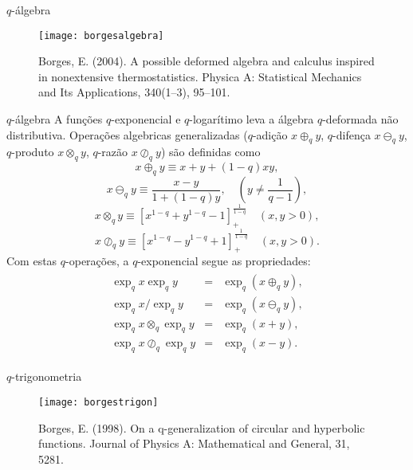 \documentclass{beamer}
\begin{document}
\begin{frame}{$q$-álgebra}
\begin{figure}
\texttt{[image: borgesalgebra]}
\caption{Borges, E. (2004). A possible deformed algebra and calculus inspired in nonextensive thermostatistics. Physica A: Statistical Mechanics and Its Applications, 340(1–3), 95–101.}
\end{figure}
\end{frame}

\begin{frame}{$q$-álgebra}
A funções $q$-exponencial e $q$-logarítimo leva
a álgebra $q$-deformada não distributiva.    
Operações algebricas generalizadas 
($q$-adição $x \oplus_q y$, $q$-difença $x \ominus_q y$,
$q$-produto $x \otimes_q y$, $q$-razão $x \oslash_q y$) são definidas como
%
\begin{equation}
\label{eq:qsum}
 x\oplus_q y \equiv x+y+(1-q)xy,
\end{equation}
%
\begin{equation}
\label{eq:qdiff}
 x\ominus_q y \equiv \frac{x-y}{1+(1-q)y}, \quad (y\ne \frac{1}{q-1}),
\end{equation}
%
\begin{equation}
\label{eq:qproduct}
 x\otimes_q y \equiv \left[x^{1-q}+y^{1-q}-1\right]^{\frac{1}{1-q}}_+
 \quad (x,y>0),
\end{equation}
%
\begin{equation}
\label{eq:qratio}
 x\oslash_q y \equiv \left[x^{1-q}-y^{1-q}+1\right]^{\frac{1}{1-q}}_+
 \quad (x,y>0).
\end{equation}
%
Com estas $q$-operações, a $q$-exponencial  segue as propriedades:
%
\begin{eqnarray}
  \begin{array}{lll}
  \exp_q x \exp_q y          &=&\exp_q(x\oplus_qy), 
  \\
  \exp_q x / \exp_q y         &=&\exp_q(x\ominus_qy),
  \\
  \exp_q x \otimes_q \exp_q y &=&\exp_q(x+y),
  \\
  \exp_q x \oslash_q \exp_q y &=&\exp_q(x-y).
  \end{array}
\end{eqnarray}
%

\end{frame}

\begin{frame}{$q$-trigonometria}
\begin{figure}
\texttt{[image: borgestrigon]}
\caption{Borges, E. (1998). On a q-generalization of circular and hyperbolic functions. Journal of Physics A: Mathematical and General, 31, 5281.}
\end{figure}
\end{frame}
\end{document}
